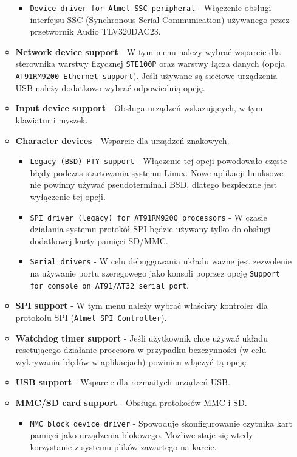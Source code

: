 \documentclass[a4paper,12pt]{book}
\begin{document}
\begin{itemize}
\begin{itemize}
\begin{itemize}
										\item \texttt{Device driver for Atmel SSC peripheral} - Włączenie obsługi interfejsu SSC (Synchronous Serial Communication) używanego przez przetwornik Audio TLV320DAC23.
									\end{itemize}								
								\item \textbf{Network device support} - W tym menu należy wybrać wsparcie dla sterownika warstwy fizycznej \texttt{STE100P} oraz warstwy łącza danych (opcja \texttt{AT91RM9200 Ethernet support}). Jeśli używane są sieciowe urządzenia USB należy dodatkowo wybrać odpowiednią opcję.
								\item \textbf{Input device support} - Obsługa urządzeń wskazujących, w tym klawiatur i myszek.
								\item \textbf{Character devices} - Wsparcie dla urządzeń znakowych.
									\begin{itemize}
										\item \texttt{Legacy (BSD) PTY support} - Włączenie tej opcji powodowało częste błędy podczas startowania systemu Linux. Nowe aplikacji linuksowe nie powinny używać pseudoterminali BSD, dlatego bezpieczne jest wyłączenie tej opcji.
										\item \texttt{SPI driver (legacy) for AT91RM9200 processors} - W czasie działania systemu protokół SPI będzie używany tylko do obsługi dodatkowej karty pamięci SD/MMC.
										\item \texttt{Serial drivers} - W celu debuggowania układu ważne jest zezwolenie na używanie portu szeregowego jako konsoli poprzez opcję \texttt{Support for console on AT91/AT32 serial port}.
									\end{itemize}
								\item \textbf{SPI support} - W tym menu należy wybrać właściwy kontroler dla protokołu SPI (\texttt{Atmel SPI Controller}).
								\item \textbf{Watchdog timer support} - Jeśli użytkownik chce używać układu resetującego działanie procesora w przypadku bezczynności (w celu wykrywania błędów w aplikacjach) powinien włączyć tą opcję.
								\item \textbf{USB support} - Wsparcie dla rozmaitych urządzeń USB.
								\item \textbf{MMC/SD card support} - Obsługa protokołów MMC i SD.
									\begin{itemize}
										\item \texttt{MMC block device driver} - Spowoduje skonfigurowanie czytnika kart pamięci jako urządzenia blokowego. Możliwe staje się wtedy korzystanie z systemu plików zawartego na karcie.

\end{itemize}
\end{itemize}
\end{itemize}
\end{document}
